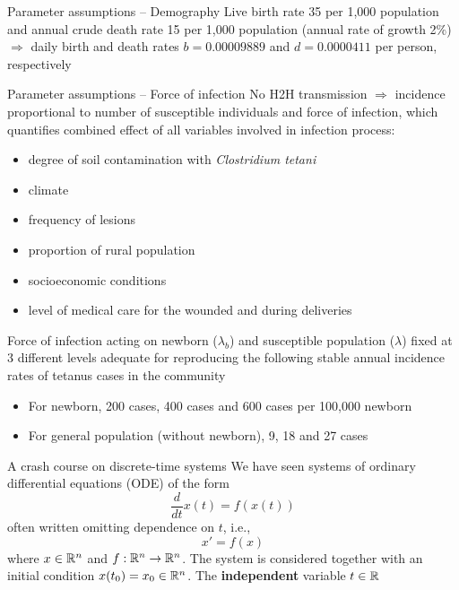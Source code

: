 \documentclass[aspectratio=169]{beamer}
\begin{document}
\begin{frame}{Parameter assumptions -- Demography}
  Live birth rate 35 per 1,000 population and annual crude death rate 15 per 1,000 population (annual rate of growth 2\%) $\Rightarrow$ daily birth and death rates $b=0.00009889$ and $d=0.0000411$ per person, respectively
\end{frame}

\begin{frame}{Parameter assumptions -- Force of infection}
  No H2H transmission $\Rightarrow$ incidence proportional to number of susceptible individuals and force of infection, which quantifies combined effect of all variables involved in infection process:
  \begin{itemize}
    \item degree of soil contamination with \emph{Clostridium tetani}
    \item climate
    \item frequency of lesions
    \item proportion of rural population
    \item socioeconomic conditions
    \item level of medical care for the wounded and during deliveries
  \end{itemize}
\end{frame}

\begin{frame}
  Force of infection acting on newborn ($\lambda_b$) and susceptible population ($\lambda$) fixed at 3 different levels adequate for reproducing the following stable annual incidence rates of tetanus cases in the community
  \begin{itemize}
    \item For newborn, 200 cases, 400 cases and 600 cases per 100,000 newborn
    \item For general population (without newborn), 9, 18 and 27 cases
  \end{itemize}
\end{frame}

\begin{frame}{A crash course on discrete-time systems}
  We have seen systems of ordinary differential equations (ODE) of the form 
  \[
    \frac{d}{dt}x(t)=f(x(t))
  \]
  often written omitting dependence on $t$, i.e.,
  \begin{equation}\label{eq:ODE}
    x' = f(x)
  \end{equation}
  where $x\in\mathbb{R}^n$ and $f:\mathbb{R}^n\to\mathbb{R}^n$. The system is considered together with an initial condition $x(t_0)=x_0\in\mathbb{R}^n$.
  \vfill
  The \textbf{independent} variable $t\in\mathbb{R}$
\end{frame}
\end{document}
